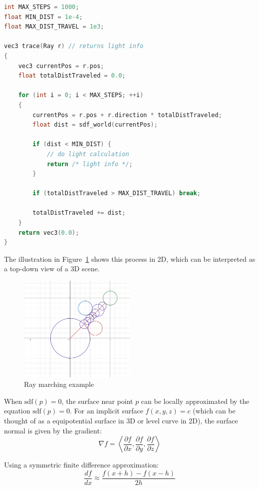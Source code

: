 \begin{lstlisting}[language=C]
int MAX_STEPS = 1000;
float MIN_DIST = 1e-4;
float MAX_DIST_TRAVEL = 1e3;

vec3 trace(Ray r) // returns light info
{
    vec3 currentPos = r.pos;
    float totalDistTraveled = 0.0;

    for (int i = 0; i < MAX_STEPS; ++i)
    {
        currentPos = r.pos + r.direction * totalDistTraveled;
        float dist = sdf_world(currentPos);

        if (dist < MIN_DIST) {
            // do light calculation
            return /* light info */;
        }

        if (totalDistTraveled > MAX_DIST_TRAVEL) break;

        totalDistTraveled += dist;
    }
    return vec3(0.0);
}
\end{lstlisting}

The illustration in Figure~\ref{fig:raymarching_eg} shows this process in 2D, which can be interpreted as a top-down view of a 3D scene.

\begin{figure}[H]
    \centering
    \includegraphics[width=0.5\textwidth]{images/raymarching_eg.png}
    \caption{Ray marching example}
    \label{fig:raymarching_eg}
\end{figure}

When $\text{sdf}(p) = 0$, the surface near point $p$ can be locally approximated by the equation $\text{sdf}(p) = 0$. For an implicit surface $f(x, y, z) = c$ (which can be thought of as a equipotential surface in 3D or level curve in 2D), the surface normal is given by the gradient:
\[
\nabla f = \left\langle \frac{\partial f}{\partial x}, \frac{\partial f}{\partial y}, \frac{\partial f}{\partial z} \right\rangle
\]

Using a symmetric finite difference approximation:
\[
\frac{df}{dx} \approx \frac{f(x + h) - f(x - h)}{2h}
\]

